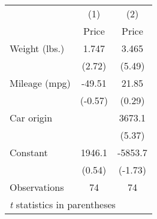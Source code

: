 \begin{tabular}{l*{2}{c}}
\hline\hline
                    &\multicolumn{1}{c}{(1)}&\multicolumn{1}{c}{(2)}\\
                    &\multicolumn{1}{c}{Price}&\multicolumn{1}{c}{Price}\\
\hline
Weight (lbs.)       &       1.747&       3.465\\
                    &      (2.72)&      (5.49)\\
[1em]
Mileage (mpg)       &      -49.51&       21.85\\
                    &     (-0.57)&      (0.29)\\
[1em]
Car origin          &            &      3673.1\\
                    &            &      (5.37)\\
[1em]
Constant            &      1946.1&     -5853.7\\
                    &      (0.54)&     (-1.73)\\
\hline
Observations        &          74&          74\\
\hline\hline
\multicolumn{3}{l}{\footnotesize \textit{t} statistics in parentheses}\\
\end{tabular}
